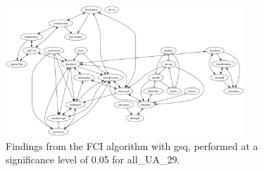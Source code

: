 \begin{figure}[htbp]
    \centering
    \includegraphics[width=0.8\textwidth]{Report/final_report/pictures/FCI_gsq_0.05_all_UA_29.png}
    \caption{Findings from the FCI algorithm with gsq, performed at a significance level of 0.05 for all_UA_29.}
    \label{fig:fci_gsq_0.05all_UA_29}
\end{figure}
